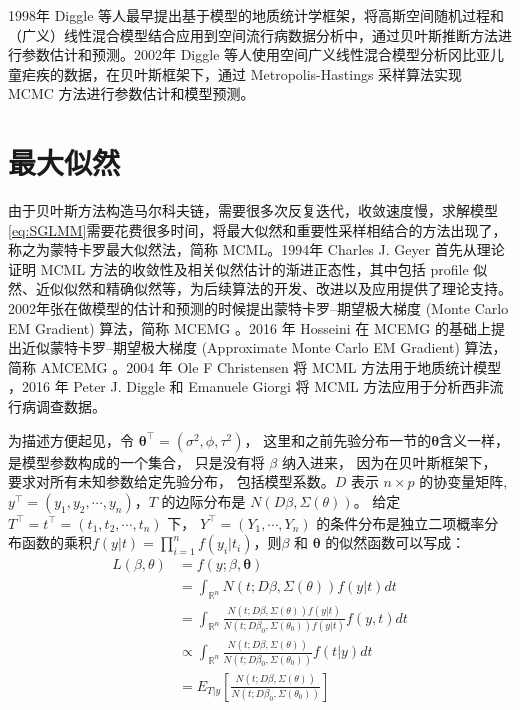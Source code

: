 \documentclass[hyperref, a4paper, UTF8, zihao = -4, linespread = 1.25, scheme = chinese]{ctexbook}
\begin{document}
1998年 Diggle
等人最早提出基于模型的地质统计学框架，将高斯空间随机过程和（广义）线性混合模型结合应用到空间流行病数据分析中，通过贝叶斯推断方法进行参数估计和预测\citep{Diggle1998}。2002年
Diggle
等人使用空间广义线性混合模型分析冈比亚儿童疟疾的数据，在贝叶斯框架下，通过
Metropolis-Hastings 采样算法实现 MCMC
方法进行参数估计和模型预测\citep{Diggle2002}。

\section{最大似然}

由于贝叶斯方法构造马尔科夫链，需要很多次反复迭代，收敛速度慢，求解模型\eqref{eq:SGLMM}需要花费很多时间，将最大似然和重要性采样相结合的方法出现了，称之为蒙特卡罗最大似然法，简称
MCML。1994年 Charles J. Geyer 首先从理论证明 MCML
方法的收敛性及相关似然估计的渐进正态性，其中包括 profile
似然、近似似然和精确似然等，为后续算法的开发、改进以及应用提供了理论支持\citep{Geyer1994On}。2002年张在做模型的估计和预测的时候提出蒙特卡罗--期望极大梯度
(Monte Carlo EM Gradient) 算法，简称 MCEMG \citep{Zhang2002On}。2016 年
Hosseini 在 MCEMG 的基础上提出近似蒙特卡罗--期望极大梯度 (Approximate
Monte Carlo EM Gradient) 算法，简称 AMCEMG \citep{Hosseini2016}。2004 年
Ole F Christensen 将 MCML 方法用于地质统计模型
\citep{Christensen2004}，2016 年 Peter J. Diggle 和 Emanuele Giorgi 将
MCML 方法应用于分析西非流行病调查数据。

为描述方便起见，令 \(\bm{\theta}^{\top} = (\sigma^2,\phi,\tau^2)\)，
这里和之前先验分布一节的\(\bm{\theta}\)含义一样，
是模型参数构成的一个集合， 只是没有将 \(\beta\) 纳入进来，
因为在贝叶斯框架下， 要求对所有未知参数给定先验分布，
包括模型系数。\(D\) 表示 \(n\times p\) 的协变量矩阵,
\(y^{\top} = (y_1,y_2,\cdots,y_n)\)，\(T\) 的边际分布是
\(N(D\beta,\Sigma(\theta))\)。 给定
\(T^{\top}=t^{\top}=(t_1,t_2,\cdots,t_n)\) 下，
\(Y^{\top}=(Y_1,\cdots,Y_n)\)
的条件分布是独立二项概率分布函数的乘积\(f(y|t)=\prod_{i=1}^{n}f(y_{i}|t_{i})\)，则\(\beta\)
和 \(\bm{\theta}\) 的似然函数可以写成：\begin{equation}
\begin{aligned}
L(\beta,\theta)
& = f(y;\beta,\bm{\theta}) \\
& = \int_{\mathbb{R}^{n}} N(t;D\beta,\Sigma(\theta))f(y|t)dt\\
& = \int_{\mathbb{R}^{n}} \frac{N(t;D\beta,\Sigma(\theta))f(y|t)}{N(t;D\beta_{0},\Sigma(\theta_{0}))f(y|t)}f(y,t)dt\\
& \varpropto \int_{\mathbb{R}^{n}} \frac{N(t;D\beta,\Sigma(\theta))}{N(t;D\beta_{0},\Sigma(\theta_{0}))}f(t|y)dt \\
&= E_{T|y}\left[\frac{N(t;D\beta,\Sigma(\theta))}{N(t;D\beta_{0},\Sigma(\theta_{0}))}\right] \label{eq:likelihood2}
\end{aligned}
\end{equation}
\end{document}
